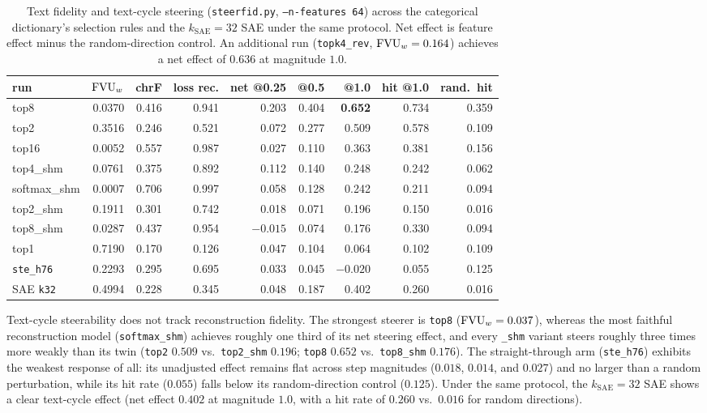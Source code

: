 \begin{table}[htbp]\centering\small\setlength{\tabcolsep}{4pt}
\begin{tabular}{@{}lrrrrrrrr@{}}
\toprule
run & $\mathrm{FVU}_w$ & chrF & loss rec. & net @0.25 & @0.5 & @1.0 & hit @1.0 & rand.\ hit \\
\midrule
top8          & 0.0370 & 0.416 & 0.941 & 0.203 & 0.404 & \textbf{0.652} & 0.734 & 0.359 \\
top2          & 0.3516 & 0.246 & 0.521 & 0.072 & 0.277 & 0.509 & 0.578 & 0.109 \\
top16         & 0.0052 & 0.557 & 0.987 & 0.027 & 0.110 & 0.363 & 0.381 & 0.156 \\
top4\_shm     & 0.0761 & 0.375 & 0.892 & 0.112 & 0.140 & 0.248 & 0.242 & 0.062 \\
softmax\_shm  & 0.0007 & 0.706 & 0.997 & 0.058 & 0.128 & 0.242 & 0.211 & 0.094 \\
top2\_shm     & 0.1911 & 0.301 & 0.742 & 0.018 & 0.071 & 0.196 & 0.150 & 0.016 \\
top8\_shm     & 0.0287 & 0.437 & 0.954 & $-0.015$ & 0.074 & 0.176 & 0.330 & 0.094 \\
top1          & 0.7190 & 0.170 & 0.126 & 0.047 & 0.104 & 0.064 & 0.102 & 0.109 \\
\texttt{ste\_h76} & 0.2293 & 0.295 & 0.695 & 0.033 & 0.045 & $-0.020$ & 0.055 & 0.125 \\
\midrule
SAE \texttt{k32} & 0.4994 & 0.228 & 0.345 & 0.048 & 0.187 & 0.402 & 0.260 & 0.016 \\
\bottomrule
\end{tabular}
\caption{Text fidelity and text-cycle steering (\texttt{steerfid.py},
\texttt{--n-features 64}) across the categorical dictionary's selection
rules and the $k_{\mathrm{SAE}}{=}32$ SAE under the same protocol. Net
effect is feature effect minus the random-direction control. An additional run
(\texttt{topk4\_rev}, $\mathrm{FVU}_w = 0.164$) achieves a net effect of $0.636$ at
magnitude $1.0$.}
\label{tab:steerfid}
\end{table}

Text-cycle steerability does not track reconstruction fidelity. The
strongest steerer is \texttt{top8} ($\mathrm{FVU}_w = 0.037$), whereas the most
faithful reconstruction model (\texttt{softmax\_shm}) achieves roughly one
third of its net steering effect, and every \texttt{\_shm} variant steers
roughly three times more weakly than its twin
(\texttt{top2} $0.509$ vs.\ \texttt{top2\_shm} $0.196$; \texttt{top8}
$0.652$ vs.\ \texttt{top8\_shm} $0.176$). The straight-through arm
(\texttt{ste\_h76}) exhibits the weakest response of all: its unadjusted
effect remains flat across step magnitudes ($0.018$, $0.014$, and $0.027$)
and no larger than a random perturbation, while its hit rate ($0.055$)
falls below its random-direction control ($0.125$). Under the same
protocol, the $k_{\mathrm{SAE}}{=}32$ SAE shows a clear text-cycle effect
(net effect $0.402$ at magnitude $1.0$, with a hit rate of $0.260$ vs.\
$0.016$ for random directions).


